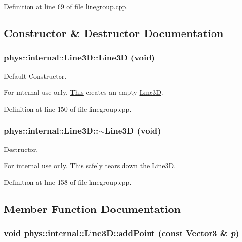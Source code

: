Definition at line 69 of file linegroup.cpp.



\subsection{Constructor \& Destructor Documentation}
\hypertarget{classphys_1_1internal_1_1Line3D_ab22b8f5fae0bb2585b1031adfff424bd}{
\subsubsection[{Line3D}]{\setlength{\rightskip}{0pt plus 5cm}phys::internal::Line3D::Line3D (void)}}
\label{d4/db5/classphys_1_1internal_1_1Line3D_ab22b8f5fae0bb2585b1031adfff424bd}


Default Constructor. 

\begin{DoxyInternal}{For internal use only.}
\hyperlink{structThis}{This} creates an empty \hyperlink{classphys_1_1internal_1_1Line3D}{Line3D}. \end{DoxyInternal}


Definition at line 150 of file linegroup.cpp.

\hypertarget{classphys_1_1internal_1_1Line3D_acddc95dd5f319d6afc68260af8bea39c}{
\subsubsection[{$\sim$Line3D}]{\setlength{\rightskip}{0pt plus 5cm}phys::internal::Line3D::$\sim$Line3D (void)}}
\label{d4/db5/classphys_1_1internal_1_1Line3D_acddc95dd5f319d6afc68260af8bea39c}


Destructor. 

\begin{DoxyInternal}{For internal use only.}
\hyperlink{structThis}{This} safely tears down the \hyperlink{classphys_1_1internal_1_1Line3D}{Line3D}. \end{DoxyInternal}


Definition at line 158 of file linegroup.cpp.



\subsection{Member Function Documentation}
\hypertarget{classphys_1_1internal_1_1Line3D_aeb3b828b35b4c8ed76158285be6ddc67}{
\subsubsection[{addPoint}]{\setlength{\rightskip}{0pt plus 5cm}void phys::internal::Line3D::addPoint (const {\bf Vector3} \& {\em p})}}
\label{d4/db5/classphys_1_1internal_1_1Line3D_aeb3b828b35b4c8ed76158285be6ddc67}


